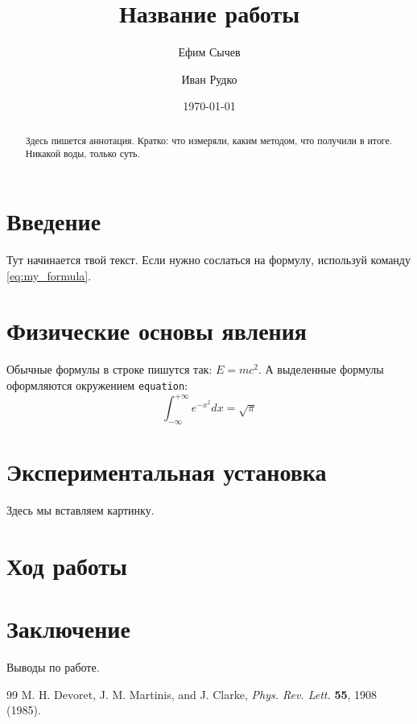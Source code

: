 \documentclass[reprint, amsmath, amssymb, aps, pra, nofootinbib]{revtex4-2}
\begin{document}
\title{Название работы}

\author{Ефим Сычев}

\author{Иван Рудко}

\date{\today}

\begin{abstract}
Здесь пишется аннотация. Кратко: что измеряли, каким методом, что получили в итоге. Никакой воды, только суть.
\end{abstract}

\maketitle

\section{Введение}
Тут начинается твой текст. Если нужно сослаться на формулу, используй команду \ref{eq:my_formula}.

\section{Физические основы явления}
Обычные формулы в строке пишутся так: $E = mc^2$. 
А выделенные формулы оформляются окружением \texttt{equation}:
\begin{equation}
    \int_{-\infty}^{+\infty} e^{-x^2} dx = \sqrt{\pi}
    \label{eq:my_formula}
\end{equation}

\section{Экспериментальная установка}
Здесь мы вставляем картинку.

\section{Ход работы}

\section{Заключение}
Выводы по работе. 

\begin{thebibliography}{99}
M. H. Devoret, J. M. Martinis, and J. Clarke, \textit{Phys. Rev. Lett.} \textbf{55}, 1908 (1985).
\end{thebibliography}
\end{document}
